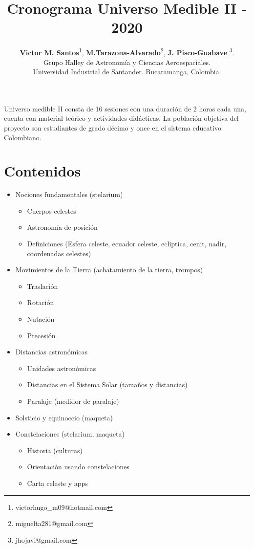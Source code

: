 \documentclass[10pt,a4paper]{article}
\title{Cronograma Universo Medible II - 2020}
\author{\textbf{Victor M. Santos}\thanks{victorhugo\_m09@hotmail.com}, \textbf{M.Tarazona-Alvarado}\thanks{miguelta281@gmail.com}, \textbf{J. Pisco-Guabave} \thanks{jhojavi@gmail.com}. \\ Grupo Halley de Astronomía y Ciencias Aeroespaciales. \\ Universidad Industrial de Santander. Bucaramanga, Colombia.}
\date{ }
\begin{document}
\maketitle

Universo medible II consta de 16 sesiones con una duración de 2 horas cada una, cuenta con material teórico y actividades didácticas. La población objetiva del proyecto son estudiantes de grado décimo y once en el sistema educativo Colombiano. 

\tableofcontents
\section{Contenidos}
\begin{itemize}
\item Nociones fundamentales (stelarium)
 \begin{itemize}
  \item Cuerpos celestes 
  \item Astronomía de posición 
  \item Definiciones (Esfera celeste, ecuador celeste, ecliptica, cenit, nadir, coordenadas celestes)
 \end{itemize}
\item Movimientos de la Tierra (achatamiento de la tierra, trompos)
 \begin{itemize}
  \item Traslación 
  \item Rotación
  \item Nutación
  \item Precesión 
 \end{itemize}
\item Distancias astronómicas 
 \begin{itemize}
 \item Unidades astronómicas
 \item Distancias en el Sistema Solar (tamaños y distancias)
 \item Paralaje (medidor de paralaje)
 \end{itemize} 
\item Solsticio y equinoccio (maqueta)
\item Constelaciones (stelarium, maqueta)
 \begin{itemize}
  \item Historia (culturas)
  \item Orientación usando constelaciones 
  \item Carta celeste y apps
 \end{itemize}

\end{itemize}
\end{document}
